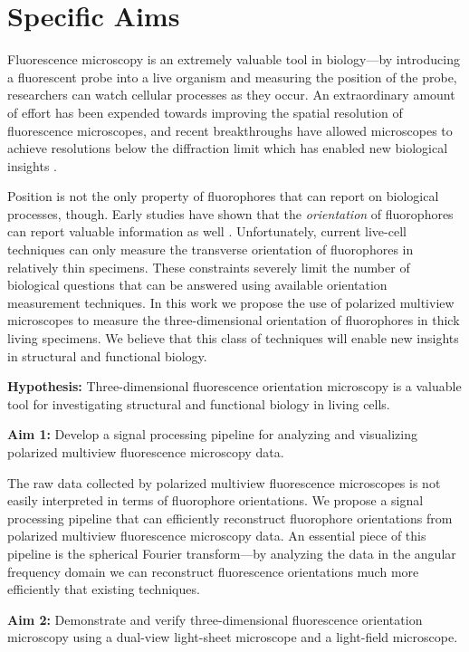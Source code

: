 \documentclass[11pt, draft]{article}
\begin{document}
\section*{Specific Aims}
Fluorescence microscopy is an extremely valuable tool in
biology---by introducing a fluorescent probe into a live organism and measuring
the position of the probe, researchers can watch cellular processes as they
occur. An extraordinary amount of effort has been expended towards improving the
spatial resolution of fluorescence microscopes, and recent breakthroughs have
allowed microscopes to achieve resolutions below the diffraction limit which has
enabled new biological insights \cite{nobel}.

Position is not the only property of fluorophores that can report on biological
processes, though. Early studies have shown that the \textit{orientation} of
fluorophores can report valuable information as well
\cite{weiss1999}. Unfortunately, current live-cell techniques can only measure
the transverse orientation of fluorophores in relatively thin specimens. These
constraints severely limit the number of biological questions that can be
answered using available orientation measurement techniques. In this work we
propose the use of polarized multiview microscopes to measure the
three-dimensional orientation of fluorophores in thick living specimens. We
believe that this class of techniques will enable new insights in structural and
functional biology.

\noindent\textbf{Hypothesis:} Three-dimensional fluorescence orientation microscopy is a
valuable tool for investigating structural and functional biology in living
cells.

\noindent\textbf{Aim 1:} Develop a signal processing pipeline for analyzing and visualizing polarized multiview fluorescence microscopy data.

The raw data collected by polarized multiview fluorescence microscopes is not
easily interpreted in terms of fluorophore orientations. We propose a signal
processing pipeline that can efficiently reconstruct fluorophore orientations
from polarized multiview fluorescence microscopy data. An essential piece of
this pipeline is the spherical Fourier transform---by analyzing the data in the
angular frequency domain we can reconstruct fluorescence orientations much more
efficiently that existing techniques.

\noindent\textbf{Aim 2:} Demonstrate and verify three-dimensional fluorescence
orientation microscopy using a dual-view light-sheet microscope and a
light-field microscope.
\end{document}
